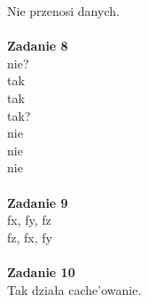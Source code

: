 \documentclass[12pt, a4paper, polish, openany]{book}
\begin{document}
Nie przenosi danych. \\\\
\textbf{Zadanie 8} \\
nie? \\
tak \\
tak \\
tak? \\
nie \\
nie \\
nie \\\\
\textbf{Zadanie 9} \\
fx, fy, fz \\
fz, fx, fy \\\\
\textbf{Zadanie 10} \\
Tak działa cache'owanie. \\\\
\end{document}
